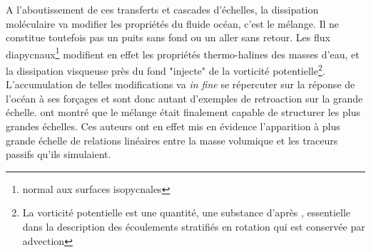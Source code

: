 A l'aboutissement de ces transferts et cascades d'échelles, la dissipation moléculaire va modifier les propriétés du fluide océan, c'est le mélange.
Il ne constitue toutefois pas un puits sans fond ou un aller sans retour. Les flux diapycnaux\footnote{normal aux surfaces isopycnales} modifient en effet les propriétés thermo-halines des masses d'eau, et la dissipation visqueuse près du fond "injecte" de la vorticité potentielle\footnote{La vorticité potentielle est une quantité, une substance d'après \cite{haynes_conservation_1990}, essentielle dans la description des écoulements stratifiés en rotation qui est conservée par advection}. L'accumulation de telles modifications va \textit{in fine} se répercuter sur la réponse de l'océan à ses forçages et sont donc autant d'exemples de retroaction sur la grande échelle.
\color{blue}
\cite{penney_2020} ont montré que le mélange était finalement capable de structurer les plus grandes échelles. Ces auteurs ont en effet mis en évidence l'apparition à plus grande échelle de relations linéaires entre la masse volumique et les traceurs passifs qu'ils simulaient.\color{black}


